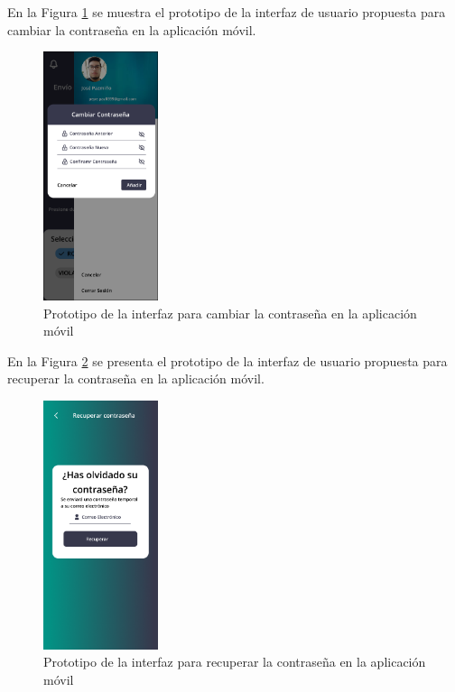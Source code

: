En la Figura \ref{fig:prototipo-cambiar-contrasena-mobile} se muestra el prototipo de la interfaz de usuario propuesta para
cambiar la contraseña en la aplicación móvil.

\begin{figure}[H]
      \centering
      \includegraphics[width=0.3\textwidth]{chapters/III-resultados-y-discusion/resources/images/prototipo-cambiar-contrasena-mobile.png}
      \caption{Prototipo de la interfaz para cambiar la contraseña en la aplicación móvil}
      \label{fig:prototipo-cambiar-contrasena-mobile}
\end{figure}

En la Figura \ref{fig:prototipo-recuperar-contrasena-mobile} se presenta el prototipo de la interfaz de usuario propuesta para
recuperar la contraseña en la aplicación móvil.

\begin{figure}[H]
      \centering
      \includegraphics[width=0.3\textwidth]{chapters/III-resultados-y-discusion/resources/images/prototipo-recuperar-contrasena-mobile.png}
      \caption{Prototipo de la interfaz para recuperar la contraseña en la aplicación móvil}
      \label{fig:prototipo-recuperar-contrasena-mobile}
\end{figure}


